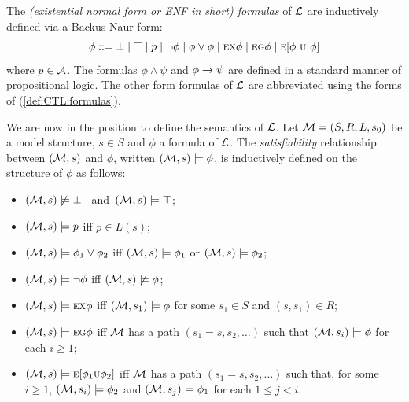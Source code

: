 \documentclass[letterpaper]{article} %
\begin{document}
The {\em (existential normal form or ENF in short) formulas} of
$\cal L$ are inductively defined via a Backus Naur form:
\begin{equation}\label{def:CTL:formulas}
  \phi ::=  \bot \mid \top \mid p \mid\neg\phi \mid \phi\lor\phi \mid
    \EXIST \NEXT \phi \mid
    \EXIST \GLOBAL \phi \mid
    \EXIST [\phi\ \UNTIL\ \phi]%
\end{equation}
where $p\in\cal A$. The formulas $\phi\land\psi$ and $\phi\rightarrow\psi$
are defined in a standard manner of propositional logic.
The other form formulas of $\cal L$ are abbreviated
using the forms of (\ref{def:CTL:formulas}).

We are now in the position to define the semantics of $\cal L$.
Let ${\cal M}=(S,R,L,s_0)$ be a model structure, $s\in S$ and $\phi$ a formula of $\cal L$.
The {\em satisfiability} relationship between $({\cal M},s)$ and $\phi$,
written $({\cal M},s)\models\phi$, is inductively defined on the structure of $\phi$ as follows:

\begin{itemize}
  \item $({\cal M},s)\not\models\bot$ \ and\  $({\cal M},s)\models\top$;
  \item $({\cal M},s)\models p$ iff $p\in L(s)$;
  \item $({\cal M},s)\models \phi_1\lor\phi_2$ iff
    $({\cal M},s)\models \phi_1$ or $({\cal M},s)\models \phi_2$;
  \item $({\cal M},s)\models \neg\phi$ iff  $({\cal M},s)\not\models\phi$;
  \item $({\cal M},s)\models \textsc{e}\textsc{x}\phi$ iff
    $({\cal M},s_1)\models\phi$ for some $s_1\in S$ and $(s,s_1)\in R$;
  \item $({\cal M},s)\models \textsc{e}\textsc{g}\phi$ iff
    $\cal M$ has a path $(s_1=s,s_2,\ldots)$ such that
    $({\cal M},s_i)\models\phi$ for each $i\ge 1$;
  \item $({\cal M},s)\models \textsc{e}[\phi_1\textsc{u}\phi_2]$ iff
    $\cal M$ has a path $(s_1=s,s_2,\ldots)$ such that, for some $i\ge 1$,
    $({\cal M},s_i)\models\phi_2$ and
    $({\cal M},s_j)\models\phi_1$ for each $1\leq j<i$.
\end{itemize}
\end{document}
